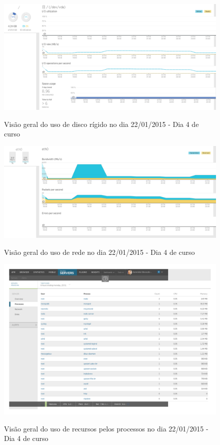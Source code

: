 \documentclass[
	12pt,				%
	oneside,			%
	a4paper,			%
	english,			%
	brazil				%
	]{abntex2ppgsi}
\begin{document}
\begin{apendicesenv}
\begin{figure}[ht]
\centering
\caption{Visão geral do uso de disco rígido no dia 22/01/2015 - Dia 4 de curso}
\includegraphics[width=1.0\textwidth]{relatorios/22-01-15/disk_cropped.pdf} 
\label{fig:recursos_dia1_2} 
\end{figure}

\begin{figure}[ht]
\centering
\caption{Visão geral do uso de rede no dia 22/01/2015 - Dia 4 de curso}
\includegraphics[width=1.0\textwidth]{relatorios/22-01-15/network_cropped.pdf} 
\label{fig:recursos_dia1_3} 
\end{figure}

\begin{figure}[ht]
\centering
\caption{Visão geral do uso de recursos pelos processos no dia 22/01/2015 - Dia 4 de curso}
\includegraphics[page=2,width=1.0\textwidth]{relatorios/22-01-15/process-inspector_cropped.pdf} 
\label{fig:recursos_dia1_5} 
\end{figure}




\end{apendicesenv}
\end{document}
